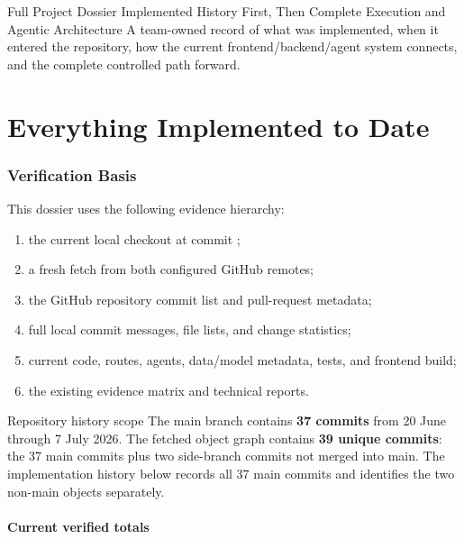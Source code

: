\documentclass[10pt,a4paper]{article}
\begin{document}
\teamtitlepage
  {Full Project Dossier}
  {Implemented History First, Then Complete Execution and Agentic Architecture}
  {A team-owned record of what was implemented, when it entered the repository, how the current
  frontend/backend/agent system connects, and the complete controlled path forward.}

\tableofcontents
\newpage

\part{Everything Implemented to Date}

\section{Verification Basis}

This dossier uses the following evidence hierarchy:

\begin{enumerate}
  \item the current local checkout at  commit ;
  \item a fresh fetch from both configured GitHub remotes;
  \item the GitHub repository commit list and pull-request metadata;
  \item full local commit messages, file lists, and change statistics;
  \item current code, routes, agents, data/model metadata, tests, and frontend build;
  \item the existing evidence matrix and technical reports.
\end{enumerate}

\begin{callout}{Repository history scope}
The main branch contains \textbf{37 commits} from 20 June through 7 July 2026. The fetched object
graph contains \textbf{39 unique commits}: the 37 main commits plus two side-branch commits not
merged into main. The implementation history below records all 37 main commits and identifies the
two non-main objects separately.
\end{callout}

\subsection{Current verified totals}
\end{document}

